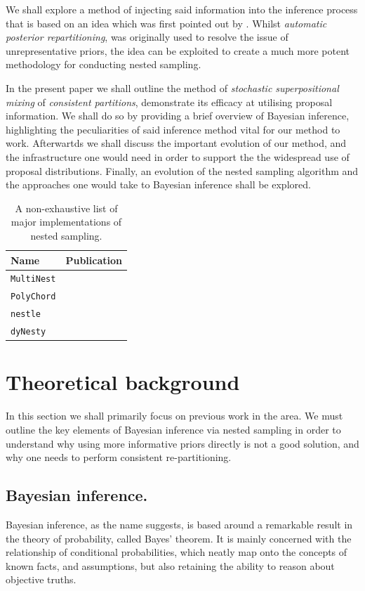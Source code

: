\documentclass[draft,usenatbib]{mnras}
\begin{document}
We shall explore a method of injecting said information into the
inference process that is based on an idea which was first pointed
out by \cite{chen-ferroz-hobson}. Whilst \emph{automatic posterior
repartitioning}, was originally used to resolve the issue of
unrepresentative priors, the idea can be exploited to create a much
more potent methodology for conducting nested sampling.


In the present paper we shall outline the method of \emph{stochastic
superpositional mixing} of \emph{consistent partitions}, demonstrate its
efficacy at utilising proposal information. We shall do so by
providing a brief overview of Bayesian inference, highlighting the
peculiarities of said inference method vital for our method to work.
Afterwartds we shall discuss the important evolution of our method,
and the infrastructure one would need in order to support the the
widespread use of proposal distributions. Finally, an evolution of
the nested sampling algorithm and the approaches one would take to
Bayesian inference shall be explored.

 \begin{table}
  \centering
  \caption{A non-exhaustive list of major implementations of nested sampling.}
  \begin{tabular}{lr}
	  \textbf{Name} & \textbf{Publication}\\
  \hline
  \texttt{MultiNest} & \cite{Feroz2009MultiNestAE} \\
  \texttt{PolyChord} & \cite{polychord} \\
  \texttt{nestle} & \cite{nestle} \\
  \texttt{dyNesty} & \cite{Speagle_2020}
  \end{tabular}
\end{table}

\section{Theoretical background}
\label{sec:orgb009956}

In this section we shall primarily focus on previous work in the
area. We must outline the key elements of Bayesian inference via
nested sampling in order to understand why using more informative
priors directly is not a good solution, and why one needs to perform
consistent re-partitioning.


\subsection{Bayesian inference.}
\label{sec:org16a4244}
Bayesian inference, as the name suggests, is based around a
remarkable result in the theory of probability, called Bayes'
theorem. It is mainly concerned with the relationship of
conditional probabilities, which neatly map onto the concepts of
known facts, and assumptions, but also retaining the ability to
reason about objective truths.
\end{document}
